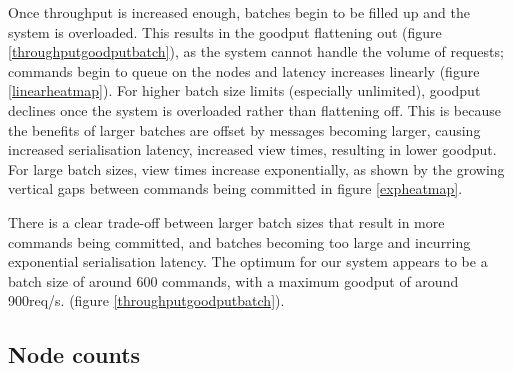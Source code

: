 Once throughput is increased enough, batches begin to be filled up and the system is overloaded. This results in the goodput flattening out (figure \ref{throughputgoodputbatch}), as the system cannot handle the volume of requests; commands begin to queue on the nodes and latency increases linearly (figure \ref{linearheatmap}). For higher batch size limits (especially unlimited), goodput declines once the system is overloaded rather than flattening off. This is because the benefits of larger batches are offset by messages becoming larger, causing increased serialisation latency, increased view times, resulting in lower goodput. For large batch sizes, view times increase exponentially, as shown by the growing vertical gaps between commands being committed in figure \ref{expheatmap}.

There is a clear trade-off between larger batch sizes that result in more commands being committed, and batches becoming too large and incurring exponential serialisation latency. The optimum for our system appears to be a batch size of around 600 commands, with a maximum goodput of around 900req/s. (figure \ref{throughputgoodputbatch}).



\subsection{Node counts} \label{nodecountseval}


